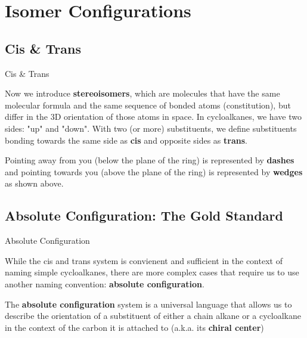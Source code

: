 \documentclass[10pt]{article}
\begin{document}
\section{Isomer Configurations}

  \subsection{Cis \& Trans}

    \begin{core}{Cis \& Trans}

      Now we introduce \textbf{stereoisomers}, which are molecules that have the same molecular formula and the same sequence of bonded atoms (constitution), but differ in the 3D orientation of those atoms in space. In cycloalkanes, we have two sides: "up" and "down". With two (or more) substituents, we define substituents bonding towards the same side as \textbf{cis} and opposite sides as \textbf{trans}.


      Pointing away from you (below the plane of the ring) is represented by \textbf{dashes} and pointing towards you (above the plane of the ring) is represented by \textbf{wedges} as shown above.

    \end{core}

  \subsection{Absolute Configuration: The Gold Standard}

    \begin{core}{Absolute Configuration}

      While the cis and trans system is convienent and sufficient in the context of naming simple cycloalkanes, there are more complex cases that require us to use another naming convention: \textbf{absolute configuration}.

      The \textbf{absolute configuration} system is a universal language that allows us to describe the orientation of a substituent of either a chain alkane or a cycloalkane in the context of the carbon it is attached to (a.k.a. its \textbf{chiral center})

    \end{core}
\end{document}
